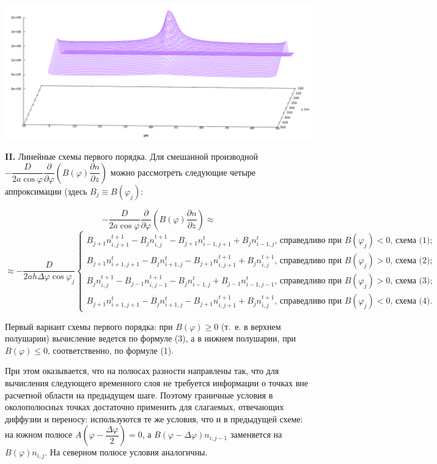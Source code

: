 \documentclass[2pt, a4paper, fleqn]{extarticle}
\let\leq\leqslant
\let\geq\geqslant
\begin{document}
\includegraphics[scale=0.5]{nonlinear}

\bigskip

\newpage



{\bf II.} Линейные схемы первого порядка. Для смешанной производной $-\dfrac{D}{2a\cos\varphi}\dfrac{\partial}{\partial\varphi}\left(B(\varphi)\dfrac{\partial n}{\partial z}\right)$ можно рассмотреть следующие четыре аппроксимации (здесь $B_j \equiv B(\varphi_j)$: 

$$-\dfrac{D}{2a\cos\varphi}\dfrac{\partial}{\partial\varphi}\left(B(\varphi)\dfrac{\partial n}{\partial z}\right) \approx $$ $$\approx-\dfrac{D}{2ah\Delta\varphi \cos\varphi_j} \begin{cases}  B_{j+1} n_{i, j+1}^{t+1} - B_jn_{i, j}^{t+1} - B_{j+1}n_{i-1, j+1}^t + B_j n_{i-1, j}^t \mbox{, справедливо при } B(\varphi_j) < 0 \mbox{, схема (1);}\\ B_{j+1}n_{i+1, j+1}^t - B_j n_{i+1, j}^t - B_{j+1}n_{i, j+1}^{t+1}+B_j n_{i, j}^{t+1}\mbox{, справедливо при } B(\varphi_j) > 0 \mbox{, схема (2);} \\ B_j n_{i,j}^{t+1} - B_{j-1}n_{i, j-1}^{t+1} - B_j n_{i-1, j}^t + B_{j-1}n_{i-1, j-1}^t\mbox{, справедливо при } B(\varphi_j) > 0 \mbox{, схема (3);} \\ B_{j+1}n_{i+1, j+1}^t - B_j n_{i+1, j}^t - B_{j+1}n_{i, j+1}^{t+1} + B_{j}n_{i, j}^{t+1}\mbox{, справедливо при } B(\varphi_j) < 0 \mbox{, схема (4).}\end{cases}$$ 

Первый вариант схемы первого порядка: при $B(\varphi) \geq 0$ (т.~е. в верхнем полушарии) вычисление ведется по формуле (3), а в нижнем полушарии, при $B(\varphi) \leq 0$, соответственно, по формуле (1).

При этом оказывается, что на полюсах разности направлены так, что для вычисления следующего временного слоя не требуется информации о точках вне расчетной области на предыдущем шаге. Поэтому граничные условия в околополюсных точках достаточно применить для слагаемых, отвечающих диффузии и переносу: используются те же условия, что и в предыдущей схеме: на южном полюсе $A\left(\varphi - \dfrac{\Delta\varphi}{2}\right) = 0$, а $B(\varphi - \Delta\varphi) n_{i, j-1}$ заменяется на $B(\varphi) n_{i, j}$. На северном полюсе условия аналогичны.
\end{document}
